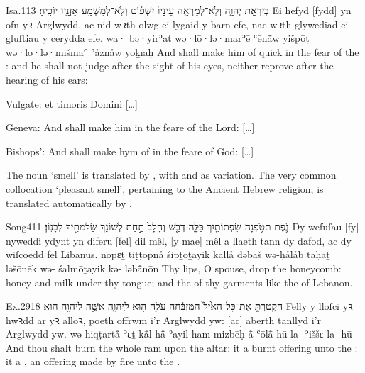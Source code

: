 \begin{example}{Isa.}{11}{3}{}{}
	\quoling
	{ בְּיִרְאַ֣ת יְהוָ֑ה וְלֹֽא־לְמַרְאֵ֤ה עֵינָיו֙ יִשְׁפּ֔וֹט וְלֹֽא־לְמִשְׁמַ֥ע אָזְנָ֖יו יוֹכִֽיחַ׃}
	{Ei  hefyd [fydd] yn ofn yꝛ Arglwydd, ac nid wꝛth olwg ei lygaid y barn efe, nac wꝛth glywediad ei gluſtiau y cerydda efe.}
	{wa· bə·yirʾaṯ {\YHWH} wə·lō·lə·marʾē ʿēnå̄w yišpōṭ wə·lō·lə·mišmaʿ ʾå̄znå̄w yōḵīaḥ}
	{And shall make him of quick  in the fear of the {\LORD}: and he shall not judge after the sight of his eyes, neither reprove after the hearing of his ears:}
\end{example}
\begin{compactdesc}\small
	\item [Vulgate:] et  timoris Domini […]
	\item [Geneva:] And shall make him  in the feare of the Lord: […]
	\item [Bishops’:] And shall make hym of  in the feare of God: […]
\end{compactdesc}




\begin{paper}
	The noun  ‘smell’ is translated by , with  and  as variation. The very common collocation  ‘pleasant smell’, pertaining to the Ancient Hebrew religion, is translated automatically by .
\end{paper}

\begin{example}{Song}{4}{11}{}{}
	\quoling
	{נֹ֛פֶת תִּטֹּ֥פְנָה שִׂפְתוֹתַ֖יִךְ כַּלָּ֑ה דְּבַ֤שׁ וְחָלָב֙ תַּ֣חַת לְשׁוֹנֵ֔ךְ  שַׂלְמֹתַ֖יִךְ  לְבָנֽוֹן׃}
	{Dy wefuſau [fy] nyweddi ydynt yn diferu [fel] dil mêl, [y mae] mêl a llaeth tann dy dafod, ac  dy wiſcoedd fel  Libanus.}
	{nōp̄ɛṯ tiṭṭōp̄nå̄ śip̄ṯōṯayiḵ kallå̄ dəḇaš wə-ḥå̄lå̄ḇ taḥaṯ ləšōnēḵ wə- śalmōṯayiḵ kə- ləḇå̄nōn}
	{Thy lips, O  spouse, drop  the honeycomb: honey and milk  under thy tongue; and the  of thy garments  like the  of Lebanon.}
\end{example}

\begin{example}{Ex.}{29}{18}{}{}
	\quoling
	{הִקְטַרְתָּ֤ אֶת־כָּל־הָאַ֙יִל֙ הַמִּזְבֵּ֔חָה עֹלָ֥ה ה֖וּא לַֽיהוָ֑ה  אִשֶּׁ֥ה לַיהוָ֖ה הֽוּא׃}
	{Felly y lloſci yꝛ hwꝛdd ar yꝛ alloꝛ, poeth offrwm i’r Arglwydd yw:  [ac] aberth tanllyd i’r Arglwydd yw.}
	{wə-hiqṭartå̄ ʾɛṯ-kå̄l-hå̄-ʾayil ham-mizbēḥ-å̄ ʿōlå̄ hū la-{\YHWH}  ʾiššɛ la-{\YHWH} hū}
	{And thou shalt burn the whole ram upon the altar: it  a burnt offering unto the {\LORD}: it  a , an offering made by fire unto the {\LORD}.}
\end{example}
